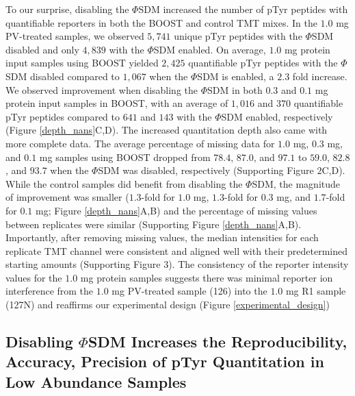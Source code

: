 \documentclass[journal=jprobs,manuscript=article]{achemso}
\begin{document}
To our surprise, disabling the $\Phi$SDM increased the number of pTyr peptides with quantifiable reporters in both the BOOST and control TMT mixes. In the $1.0$ mg PV-treated samples, we observed $5{,}741$ unique pTyr peptides with the $\Phi$SDM disabled and only $4{,}839$ with the $\Phi$SDM enabled. On average, $1.0$ mg protein input samples using BOOST yielded $2{,}425$ quantifiable pTyr peptides with the $\Phi$SDM disabled compared to $1{,}067$ when the $\Phi$SDM is enabled, a $2.3$ fold increase. We observed improvement when disabling the $\Phi$SDM in both $0.3$ and $0.1$ mg protein input samples in BOOST, with an average of $1{,}016$ and $370$ quantifiable pTyr peptides compared to $641$ and $143$ with the $\Phi$SDM enabled, respectively (Figure \ref{depth_nans}C,D). The increased quantitation depth also came with more complete data. The average percentage of missing data for $1.0$ mg, $0.3$ mg, and $0.1$ mg samples using BOOST dropped from $78.4$, $87.0$, and $97.1$ to $59.0$, $82.8$, and $93.7$ when the $\Phi$SDM was disabled, respectively (Supporting Figure $2$C,D).  While the control samples did benefit from disabling the $\Phi$SDM, the magnitude of improvement was smaller ($1.3$-fold for $1.0$ mg, $1.3$-fold for $0.3$ mg, and $1.7$-fold for $0.1$ mg; Figure \ref{depth_nans}A,B) and the percentage of missing values between replicates were similar (Supporting Figure \ref{depth_nans}A,B). Importantly, after removing missing values, the median intensities for each replicate TMT channel were consistent and aligned well with their predetermined starting amounts (Supporting Figure $3$). The consistency of the reporter intensity values for the $1.0$ mg protein samples suggests there was minimal reporter ion interference from the $1.0$ mg PV-treated sample (126) into the $1.0$ mg R1 sample (127N) and reaffirms our experimental design (Figure \ref{experimental_design})


\subsection{Disabling $\Phi$SDM Increases the Reproducibility, Accuracy, Precision of pTyr Quantitation in Low Abundance Samples}
\end{document}
